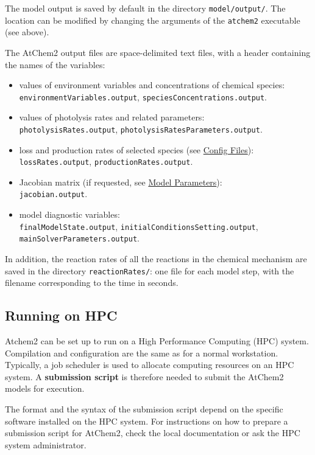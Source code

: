 The model output is saved by default in the directory
\texttt{model/output/}. The location can be modified by changing the
arguments of the \texttt{atchem2} executable (see above).

The AtChem2 output files are space-delimited text files, with a header
containing the names of the variables:

\begin{itemize}
\item values of environment variables and concentrations of chemical
  species:\\ \texttt{environmentVariables.output},
  \texttt{speciesConcentrations.output}.
\item values of photolysis rates and related parameters:\\
  \texttt{photolysisRates.output},
  \texttt{photolysisRatesParameters.output}.
\item loss and production rates of selected species (see
  \hyperref[sec:config]{Config Files}):\\ \texttt{lossRates.output},
  \texttt{productionRates.output}.
\item Jacobian matrix (if requested, see
  \hyperref[sec:parameters]{Model Parameters}):\\
  \texttt{jacobian.output}.
\item model diagnostic variables:\\ \texttt{finalModelState.output},
  \texttt{initialConditionsSetting.output},
  \texttt{mainSolverParameters.output}.
\end{itemize}

In addition, the reaction rates of all the reactions in the chemical
mechanism are saved in the directory \texttt{reactionRates/}: one file
for each model step, with the filename corresponding to the time in
seconds.

\subsection{Running on HPC} \label{subsec:running-on-hpc}

Atchem2 can be set up to run on a High Performance Computing (HPC)
system. Compilation and configuration are the same as for a normal
workstation. Typically, a job scheduler is used to allocate computing
resources on an HPC system. A \textbf{submission script} is therefore
needed to submit the AtChem2 models for execution.

The format and the syntax of the submission script depend on the
specific software installed on the HPC system. For instructions on how
to prepare a submission script for AtChem2, check the local
documentation or ask the HPC system administrator.

